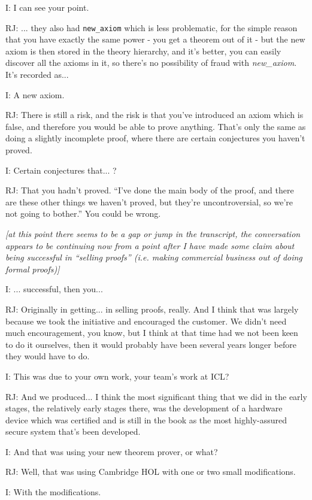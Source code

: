 \documentclass[10pt,titlepage]{book}
\begin{document}
I: I can see your point.

RJ: 	... they also had {\tt new\_axiom} which is less problematic, for the simple reason that you have exactly the same power - you get a theorem out of it - but the new axiom is then stored in the theory hierarchy, and it's better, you can easily discover all the axioms in it, so there's no possibility of fraud with {\it new\_axiom}.
It's recorded as...

I: A new axiom.

RJ: There is still a risk, and the risk is that you've introduced an axiom which is false, and therefore you would be able to prove anything.
That's only the same as doing a slightly incomplete proof, where there are certain conjectures you haven't proved.

I: Certain conjectures that... ?

RJ: That you hadn't proved.
``I've done the main body of the proof, and there are these other things we haven't proved, but they're uncontroversial, so we're not going to bother.''
You could be wrong.

\emph{[at this point there seems to be a gap or jump in the transcript, the conversation appears to be continuing now from a point after I have made some claim about being successful in ``selling proofs'' (i.e. making commercial business out of doing formal proofs)]}

I: ... successful, then you...

RJ: Originally in getting... in selling proofs, really.
And I think that was largely because we took the initiative and encouraged the customer.
We didn't need much encouragement, you know, but I think at that time had we not been keen to do it ourselves, then it would probably have been several years longer before they would have to do.

I: This was due to your own work, your team's work at ICL?

RJ: And we produced... I think the most significant thing that we did in the early stages, the relatively early stages there, was the development of a hardware device which was certified and is still in the book as the most highly-assured secure system that's been developed.

I: And that was using your new theorem prover, or what?

RJ: Well, that was using Cambridge HOL with one or two small modifications.

I: With the modifications.
\end{document}
